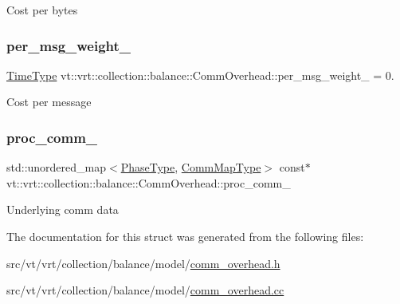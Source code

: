 Cost per bytes \mbox{\label{structvt_1_1vrt_1_1collection_1_1balance_1_1_comm_overhead_a5767b946ab89c461f3387825e8ef86df}} 
\subsubsection{\texorpdfstring{per\+\_\+msg\+\_\+weight\+\_\+}{per\_msg\_weight\_}}
{\footnotesize\ttfamily \hyperlink{namespacevt_a876a9d0cd5a952859c72de8a46881442}{Time\+Type} vt\+::vrt\+::collection\+::balance\+::\+Comm\+Overhead\+::per\+\_\+msg\+\_\+weight\+\_\+ = 0.\hspace{0.3cm}{\ttfamily [private]}}

Cost per message \mbox{\label{structvt_1_1vrt_1_1collection_1_1balance_1_1_comm_overhead_a6c5e0954d01ac8c05a44dfabdc053e0e}} 
\subsubsection{\texorpdfstring{proc\+\_\+comm\+\_\+}{proc\_comm\_}}
{\footnotesize\ttfamily std\+::unordered\+\_\+map$<$\hyperlink{namespacevt_a46ce6733d5cdbd735d561b7b4029f6d7}{Phase\+Type}, \hyperlink{namespacevt_1_1vrt_1_1collection_1_1balance_a01ee1fb0ae2da1d2ab7fdca3be9ae351}{Comm\+Map\+Type}$>$ const$\ast$ vt\+::vrt\+::collection\+::balance\+::\+Comm\+Overhead\+::proc\+\_\+comm\+\_\+\hspace{0.3cm}{\ttfamily [private]}}

Underlying comm data 

The documentation for this struct was generated from the following files\+:\begin{DoxyCompactItemize}
\item 
src/vt/vrt/collection/balance/model/\hyperlink{comm__overhead_8h}{comm\+\_\+overhead.\+h}\item 
src/vt/vrt/collection/balance/model/\hyperlink{comm__overhead_8cc}{comm\+\_\+overhead.\+cc}\end{DoxyCompactItemize}
